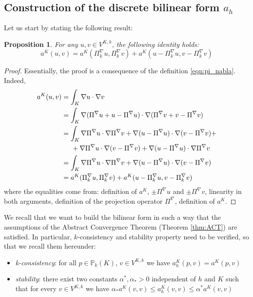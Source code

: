 \documentclass[10pt]{article}
\newtheorem{prop}{Proposition}
\begin{document}
\subsection{Construction of the discrete bilinear form $a_h$}
Let us start by stating the following result: \\
\begin{prop}
	For any $u,v \in V^{K,k}$, the following identity holds:
	\begin{equation}
	a^K(u,v)=a^K(\Pi_k^\nabla u, \Pi_k^\nabla v)+a^K(u-\Pi_k^\nabla u, v-\Pi_k^\nabla v)
	\label{eqn:identity}
	\end{equation}
	\label{prop:identity}
\end{prop}
\begin{proof}
	Essentially, the proof is a consequence of the definition \eqref{eqn:pi_nabla}. Indeed,
	\begin{align*}
	a^K(u,v) &= \int_K \nabla u \cdot \nabla v \\
	&= \int_K \nabla (\Pi^\nabla u + u - \Pi^\nabla u) \cdot \nabla (\Pi^\nabla v + v - \Pi^\nabla v)\\
	&=  \int_K \nabla \Pi^\nabla u \cdot \nabla \Pi^\nabla v + \nabla (u- \Pi^\nabla u) \cdot \nabla (v- \Pi^\nabla v) +\\ & \hspace{0.5cm} + \nabla \Pi^\nabla u \cdot \nabla (v - \Pi^\nabla v) + \nabla (u - \Pi^\nabla u) \cdot \nabla \Pi^\nabla v\\
	&=\int_K \nabla \Pi^\nabla u \cdot \nabla \Pi^\nabla v + \nabla (u- \Pi^\nabla u) \cdot \nabla (v- \Pi^\nabla v)\\
	&=a^K(\Pi_k^\nabla u, \Pi_k^\nabla v)+a^K(u-\Pi_k^\nabla u, v-\Pi_k^\nabla v)
	\end{align*} 
	where the equalities come from: definition of $a^K$, $\pm \Pi^\nabla u$ and $\pm \Pi^\nabla v$, linearity in both arguments, definition of the projection operator $\Pi^\nabla$, definition of $a^K$.
\end{proof}
We recall that we want to build the bilinear form in such a way that the assumptions of the Abstract Convergence Theorem (Theorem \eqref{thm:ACT}) are satisfied. In particular, $k$-consistency and stability property need to be verified, so that we recall them hereunder:
\begin{itemize}
	\item \textit{k-consistency}: for all $p \in \mathbb{P}_k(K)$, $v \in V^{K,k}$ we have $a_h^K(p,v)=a^K(p,v)$
	\item \textit{stability}: there exist two constants $\alpha^{*}, \alpha_{*}>0$ independent of $h$ and $K$ such that for every $v \in V^{K,k}$ we have
	$\alpha_{*}a^K(v,v) \leq a_h^K(v,v) \leq \alpha^{*}a^K(v,v)$
\end{itemize}
\end{document}
